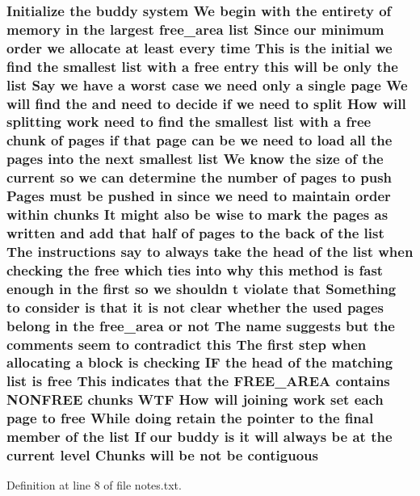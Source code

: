 \subsubsection[{\texorpdfstring{contiguous}{contiguous}}]{\setlength{\rightskip}{0pt plus 5cm}Initialize the buddy system We begin with the entirety of memory {\bf in} the largest {\bf free\+\_\+area} {\bf list} Since our minimum {\bf order} we allocate at least every time This {\bf is} the initial we find the smallest {\bf list} with a free entry this will be only the {\bf list} Say we have a worst case we need only a single {\bf page} We will find the and need to decide if we need to {\bf split} How will splitting work need to find the smallest {\bf list} with a free {\bf chunk} of {\bf pages} if that {\bf page} can be we need to load all the {\bf pages} into the next smallest {\bf list} We know the size of the current {\bf so} we can determine the number of {\bf pages} to push Pages must be pushed {\bf in} since we need to maintain {\bf order} within chunks It might also be wise to mark the {\bf pages} as written and add that half of {\bf pages} to the back of the {\bf list} The instructions say to always take the head of the {\bf list} when checking the free which ties into why this method {\bf is} fast enough {\bf in} the {\bf first} {\bf so} we shouldn t violate that Something to consider {\bf is} that {\bf it} {\bf is} {\bf not} clear whether the used {\bf pages} belong {\bf in} the {\bf free\+\_\+area} or {\bf not} The name suggests but the comments seem to contradict this The {\bf first} step when allocating a block {\bf is} checking IF the head of the matching {\bf list} {\bf is} free This indicates that the F\+R\+E\+E\+\_\+\+A\+R\+EA contains N\+O\+N\+F\+R\+EE chunks W\+TF How will joining work set each {\bf page} to free While doing retain the pointer to the final member of the {\bf list} If our buddy {\bf is} {\bf it} will always be at the current level Chunks will be {\bf not} be contiguous}\hypertarget{notes_8txt_a6ad1a4d083c4930bd2c2e57e3eb0f8e1}{}\label{notes_8txt_a6ad1a4d083c4930bd2c2e57e3eb0f8e1}


Definition at line 8 of file notes.\+txt.

